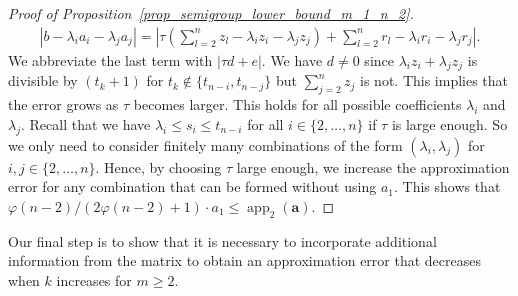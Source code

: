 \documentclass[pdflatex]{sn-jnl}
\DeclareMathOperator{\app}{app}
\newcommand{\ba}{\bm{a}}
\theoremstyle{thmstyleone}%
\theoremstyle{thmstyletwo}%
\theoremstyle{thmstylethree}%
\begin{document}
\begin{proof}[Proof of Proposition~\ref{prop_semigroup_lower_bound_m_1_n_2}]
		\begin{align*}
			\left|b - \lambda_i a_i - \lambda_j a_j\right| = \left| \tau\left(\sum_{l=2}^{n}z_l - \lambda_i z_i - \lambda_j z_j\right) + \sum_{l=2}^n r_l - \lambda_ir_i - \lambda_jr_j\right|.
		\end{align*} 
		We abbreviate the last term with $\left|\tau d + e\right|$. We have $d\neq 0$ since $\lambda_i z_i + \lambda_j z_j$ is divisible by $(t_k + 1)$ for $t_k\notin\lbrace t_{n-i},t_{n-j}\rbrace$ but $\sum_{j=2}^{n}z_j$ is not. This implies that the error grows as $\tau$ becomes larger. This holds for all possible coefficients $\lambda_i$ and $\lambda_j$. Recall that we have $\lambda_i\leq s_i\leq t_{n-i}$ for all $i\in\lbrace 2,\ldots,n\rbrace$ if $\tau$ is large enough. So we only need to consider finitely many combinations of the form $(\lambda_i,\lambda_j)$ for $i,j\in\lbrace 2,\ldots,n\rbrace$. Hence, by choosing $\tau$ large enough, we increase the approximation error for any combination that can be formed without using $a_1$. This shows that $\varphi(n-2)/(2\varphi(n-2) + 1)\cdot a_1\leq \app_{2}(\ba)$.
	\end{proof}
	Our final step is to show that it is necessary to incorporate additional information from the matrix to obtain an approximation error that decreases when $k$ increases for $m\geq 2$.
	
\end{document}
